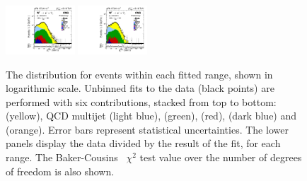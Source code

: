 \begin{figure}[htb!]
\begin{tiny}
\includegraphics[width=0.23\textwidth]{Figures/WBoson/Analysis/SignalExtraction/Signal/LOG/PLOT_MET_DATA_WToMuMi_PA_Model_TEMP_WDYDYToTauWToTauTTbar_ModifiedRayleigh_QCD_MuEtaCM_160_180_MuIso_0_15.pdf}
\includegraphics[width=0.23\textwidth]{Figures/WBoson/Analysis/SignalExtraction/Signal/LOG/PLOT_MET_DATA_WToMuMi_PA_Model_TEMP_WDYDYToTauWToTauTTbar_ModifiedRayleigh_QCD_MuEtaCM_180_193_MuIso_0_15.pdf}
\end{tiny}
\caption{The \ptmiss distribution for \WToMuNuMi events within each fitted \etaMuCM range, shown in logarithmic scale. Unbinned fits to the data (black points) are performed with six contributions, stacked from top to bottom: \WToMuNuPl (yellow), QCD multijet (light blue), \DYToMuMu (green), \WToTauNuPl (red), \DYToTauTau (dark blue) and \ttbar (orange). Error bars represent statistical uncertainties. The lower panels display the data divided by the result of the fit, for each \etaMuCM range. The Baker-Cousins~\cite{BakerCousins_Chi2} $\chi^{2}$ test value over the number of degrees of freedom is also shown.}
\label{fig:METFits_WToMuMi_PA} 
\end{figure}


